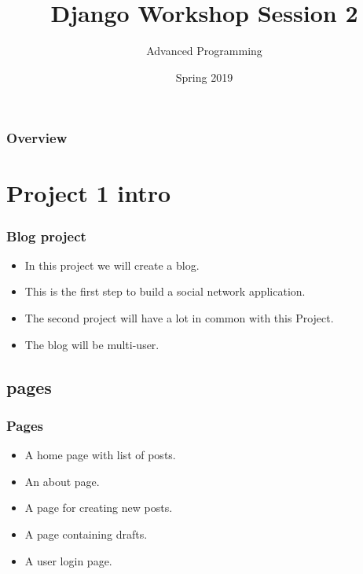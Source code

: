 \documentclass{beamer}
\title[Django Workshop]{Django Workshop Session 2} %
\author{Advanced Programming} %
\institute[AUT] %
{
	Amirkabir University of Technology\\ %
	\medskip
	\textit{} %
}
\date{Spring 2019} %
\begin{document}
	
	\begin{frame}
	\titlepage %
\end{frame}

\begin{frame}
\frametitle{Overview} %
\tableofcontents %
\end{frame}


\section{Project 1 intro}
\begin{frame}
\frametitle{Blog project}
\begin{itemize}
\item In this project we will create a blog.
\item This is the first step to build a social network application.
\item The second project will have a lot in common with this Project.
\item The blog will be multi-user.
\end{itemize}
\end{frame}

\subsection{pages}
\begin{frame}
\frametitle{Pages}
\begin{itemize}
\item A home page with list of posts.
\item An about page.
\item A page for creating new posts.
\item A page containing drafts.
\item A user login page.
\end{itemize}
\end{frame}
\end{document}

